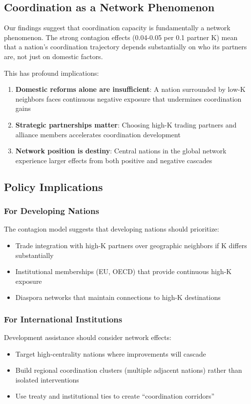 \documentclass[12pt,a4paper]{article}
\begin{document}
\subsection{Coordination as a Network Phenomenon}

Our findings suggest that coordination capacity is fundamentally a network phenomenon. The strong contagion effects (0.04-0.05 per 0.1 partner K) mean that a nation's coordination trajectory depends substantially on who its partners are, not just on domestic factors.

This has profound implications:
\begin{enumerate}
    \item \textbf{Domestic reforms alone are insufficient}: A nation surrounded by low-K neighbors faces continuous negative exposure that undermines coordination gains
    \item \textbf{Strategic partnerships matter}: Choosing high-K trading partners and alliance members accelerates coordination development
    \item \textbf{Network position is destiny}: Central nations in the global network experience larger effects from both positive and negative cascades
\end{enumerate}

\subsection{Policy Implications}

\subsubsection{For Developing Nations}
The contagion model suggests that developing nations should prioritize:
\begin{itemize}
    \item Trade integration with high-K partners over geographic neighbors if K differs substantially
    \item Institutional memberships (EU, OECD) that provide continuous high-K exposure
    \item Diaspora networks that maintain connections to high-K destinations
\end{itemize}

\subsubsection{For International Institutions}
Development assistance should consider network effects:
\begin{itemize}
    \item Target high-centrality nations where improvements will cascade
    \item Build regional coordination clusters (multiple adjacent nations) rather than isolated interventions
    \item Use treaty and institutional ties to create ``coordination corridors''
\end{itemize}
\end{document}
